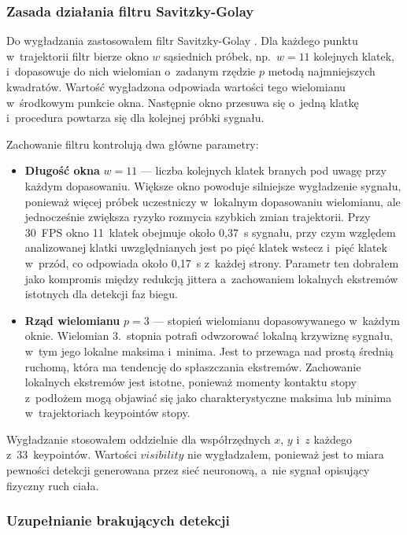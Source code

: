 \subsubsection{Zasada działania filtru Savitzky-Golay}

Do wygładzania zastosowałem filtr Savitzky-Golay \cite{savitzky1964}. Dla każdego punktu w~trajektorii filtr bierze okno $w$ sąsiednich próbek, np.~$w = 11$ kolejnych klatek, i~dopasowuje do nich wielomian o~zadanym rzędzie $p$ metodą najmniejszych kwadratów. Wartość wygładzona odpowiada wartości tego wielomianu w~środkowym punkcie okna. Następnie okno przesuwa się o~jedną klatkę i~procedura powtarza się dla kolejnej próbki sygnału.

Zachowanie filtru kontrolują dwa główne parametry:

\begin{itemize}
    \item \textbf{Długość okna} $w = 11$ --- liczba kolejnych klatek branych pod uwagę przy każdym dopasowaniu. Większe okno powoduje silniejsze wygładzenie sygnału, ponieważ więcej próbek uczestniczy w~lokalnym dopasowaniu wielomianu, ale jednocześnie zwiększa ryzyko rozmycia szybkich zmian trajektorii. Przy 30~FPS okno 11~klatek obejmuje około 0{,}37~s sygnału, przy czym względem analizowanej klatki uwzględnianych jest po pięć klatek wstecz i~pięć klatek w~przód, co odpowiada około 0{,}17~s z~każdej strony. Parametr ten dobrałem jako kompromis między redukcją jittera a~zachowaniem lokalnych ekstremów istotnych dla detekcji faz biegu.
    
    \item \textbf{Rząd wielomianu} $p = 3$ --- stopień wielomianu dopasowywanego w~każdym oknie. Wielomian 3.~stopnia potrafi odwzorować lokalną krzywiznę sygnału, w~tym jego lokalne maksima i~minima. Jest to przewaga nad prostą średnią ruchomą, która ma tendencję do spłaszczania ekstremów. Zachowanie lokalnych ekstremów jest istotne, ponieważ momenty kontaktu stopy z~podłożem mogą objawiać się jako charakterystyczne maksima lub minima w~trajektoriach keypointów stopy.
\end{itemize}

Wygładzanie stosowałem oddzielnie dla współrzędnych $x$, $y$ i~$z$ każdego z~33~keypointów. Wartości $visibility$ nie wygładzałem, ponieważ jest to miara pewności detekcji generowana przez sieć neuronową, a~nie sygnał opisujący fizyczny ruch ciała.

\subsubsection{Uzupełnianie brakujących detekcji}

